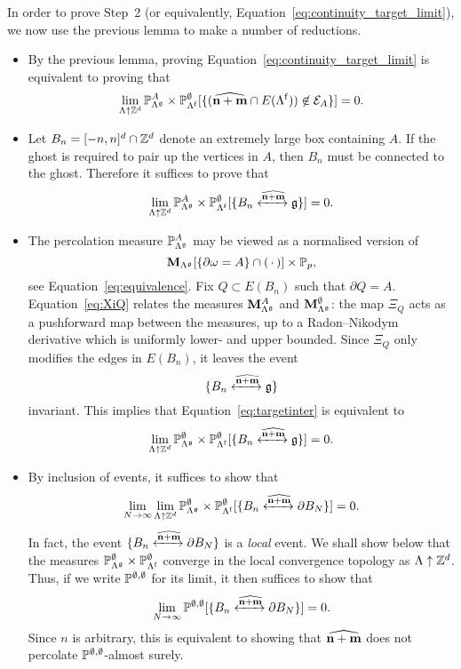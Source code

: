 In order to prove Step~2 (or equivalently, Equation~\eqref{eq:continuity_target_limit}),
we now use the previous lemma to make a number of reductions.
\begin{itemize}
    \item By the previous lemma,
    proving Equation~\eqref{eq:continuity_target_limit} is equivalent to proving that 
    \[
        \lim_{\Lambda\uparrow\Z^d}
        \P_{\Lambda^\frakg}^A\times\P_{\Lambda^\f}^\emptyset
            [\{(\widehat{\n+\m}\cap E(\Lambda^\f))\not\in\calE_A\}]=0.
    \]
    \item Let $B_n=[-n,n]^d\cap \Z^d$ denote an extremely large box
    containing $A$.
    If the ghost is required to pair up the vertices in $A$,
    then $B_n$ must be connected to the ghost.
    Therefore it suffices to prove that
    \begin{equation}
        \label{eq:targetinter}
        \lim_{\Lambda\uparrow\Z^d}
        \P_{\Lambda^\frakg}^A\times\P_{\Lambda^\f}^\emptyset
            [\{B_n \xleftrightarrow{\widehat{\n+\m}}\frakg\}]=0.
    \end{equation}
    \item The percolation measure $\P_{\Lambda^\frakg}^A$ may be viewed
    as a normalised version of \[\bfM_{\Lambda^\frakg}[\{\partial\omega=A\}\cap(\blank)]\times \P_p,\] see Equation~\eqref{eq:equivalence}.
    Fix $Q\subset E(B_n)$ such that $\partial Q=A$.
    Equation~\eqref{eq:XiQ} relates the measures $\bfM_{\Lambda^\frakg}^A$
    and $\bfM_{\Lambda^\frakg}^\emptyset$:
    the map $\Xi_Q$ acts as a pushforward map
    between the measures, up to a Radon--Nikodym derivative which is uniformly
    lower- and upper bounded.
    Since $\Xi_Q$ only modifies the edges in $E(B_n)$, it leaves the event \[\{B_n \xleftrightarrow{\widehat{\n+\m}}\frakg\}\] invariant.
    This implies that Equation~\eqref{eq:targetinter} is equivalent to 
    \begin{equation}
        \lim_{\Lambda\uparrow\Z^d}
        \P_{\Lambda^\frakg}^\emptyset\times\P_{\Lambda^\f}^\emptyset
            [\{B_n \xleftrightarrow{\widehat{\n+\m}}\frakg\}]=0.
    \end{equation}
    \item 
    By inclusion of events, it suffices to show that
    \begin{equation}
        \lim_{N\to\infty}\lim_{\Lambda\uparrow\Z^d}
        \P_{\Lambda^\frakg}^\emptyset\times\P_{\Lambda^\f}^\emptyset
            [\{B_n \xleftrightarrow{\widehat{\n+\m}}\partial B_N\}]=0.
    \end{equation}
    In fact, the event $\{B_n \xleftrightarrow{\widehat{\n+\m}}\partial B_N\}$
    is a \emph{local} event.
    We shall show below that the measures $\P_{\Lambda^\frakg}^\emptyset\times\P_{\Lambda^\f}^\emptyset$
    converge in the local convergence topology as $\Lambda\uparrow\Z^d$.
    Thus, if we write $\P^{\emptyset,\emptyset}$ for its limit, it then suffices
    to show that
    \[
        \lim_{N\to\infty}\P^{\emptyset,\emptyset}
            [\{B_n \xleftrightarrow{\widehat{\n+\m}}\partial B_N\}]=0.
    \]
    Since $n$ is arbitrary, this is equivalent to showing
    that $\widehat{\n+\m}$ does not percolate $\P^{\emptyset,\emptyset}$-almost surely.
\end{itemize}
 
